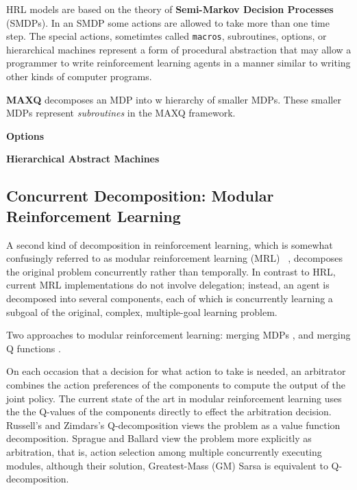 HRL models are based on the theory of {\bf Semi-Markov Decision Processes} (SMDPs). In an SMDP some actions are allowed to take more than one time step. The special actions, sometimtes called {\tt macros}, subroutines, options, or hierarchical machines represent a form of procedural abstraction that may allow a programmer to write reinforcement learning agents in a manner similar to writing other kinds of computer programs.

{\bf MAXQ} decomposes an MDP into w hierarchy of smaller MDPs. These smaller MDPs represent {\it subroutines} in the MAXQ framework.

{\bf Options}

{\bf Hierarchical Abstract Machines}


\subsection{Concurrent Decomposition: Modular Reinforcement Learning}

A second kind of decomposition in reinforcement learning, which is somewhat confusingly referred to as modular reinforcement learning (MRL) ~\cite{russell2003q-decomposition,sprague2003multiple-goal}, decomposes the original problem concurrently rather than temporally. In contrast to HRL, current MRL implementations do not involve delegation; instead, an agent is decomposed into several components, each of which is concurrently learning a subgoal of the original, complex, multiple-goal learning problem.

Two approaches to modular reinforcement learning: merging MDPs \cite{singh1998how-to-dynamically}, and merging Q functions \cite{sprague2003multiple-goal,russell2003q-decomposition}.

On each occasion that a decision for what action to take is needed, an arbitrator combines the action preferences of the components to compute the output of the joint policy.  The current state of the art in modular reinforcement learning uses the the Q-values of the components directly to effect the arbitration decision.  Russell's and Zimdars's Q-decomposition \cite{russell2003q-decomposition} views the problem as a value function decomposition.  Sprague and Ballard view the problem more explicitly as arbitration, that is, action selection among multiple concurrently executing modules, although their solution, Greatest-Mass (GM) Sarsa \cite{sprague2003multiple-goal} is equivalent to Q-decomposition.
